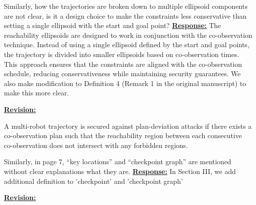 \documentclass{article}
\newcommand{\re}{\tcblower \underline{\textbf{Response:}}}
\newcommand{\rv}{{\Large{\underline{\textbf{Revision:}}}}\quad}
\newcommand{\news}{\color{blue}}
\begin{document}
\vspace{0.3cm}

\begin{cmt}{}{}
	Similarly, how the
	trajectories are broken down to multiple ellipsoid components are not
	clear, is it a design choice to make the constraints less conservative
	than setting a single ellipsoid with the start and goal point?
	\re 
	The reachability ellipsoids are designed to work in conjunction with the co-observation technique. Instead of using a single ellipsoid defined by the start and goal points, the trajectory is divided into smaller ellipsoids based on co-observation times. This approach ensures that the constraints are aligned with the co-observation schedule, reducing conservativeness while maintaining security guarantees. We also make modification to Definition 4 (Remark 1 in the original manuscript) to make this more clear.
\end{cmt}
\rv
{\news \setcounter{definition}{3}
 \begin{definition}\label{rmk:revised-security}
	A multi-robot trajectory is secured against plan-deviation attacks if there exists a co-observation plan such that the reachability region between each consecutive co-observation does not intersect with any forbidden regions.
\end{definition}}

\vspace{0.3cm}
\begin{cmt}{}{}
	Similarly, in page 7, “key locations” and “checkpoint graph” are
	mentioned without clear explanations what they are.
	\re  
	In Section III, we add additional definition to 'checkpoint' and 'checkpoint graph'
\end{cmt}
\rv
\end{document}
